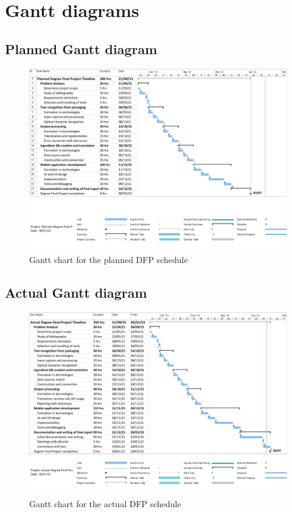 \chapter{Gantt diagrams}
\label{appendix:A}

\section{Planned Gantt diagram}

\begin{figure}
  \centering
  \includegraphics[width=\textwidth]{Figures/gantt_planned.pdf}
  \caption{%
    Gantt chart for the planned DFP schedule
  }
  \label{fig:gantt_planned}
\end{figure}

\clearpage

\section{Actual Gantt diagram}

\begin{figure}
  \centering
  \includegraphics[width=\textwidth]{Figures/gantt_actual.pdf}
  \caption{%
    Gantt chart for the actual DFP schedule
  }
  \label{fig:gantt_actual}
\end{figure}